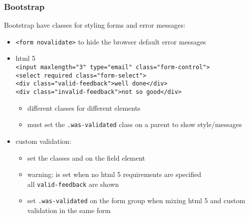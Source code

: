 \begin{frame}[fragile] \frametitle{Bootstrap}
Bootstrap have classes for styling forms and error messages:
\begin{itemize}
  \item \lstinline[style=htmlcssjs]{<form novalidate>} to hide the browser default error messages
  \item html 5
          \\ \lstinline[style=htmlcssjs]{<input maxlength="3" type="email" class="form-control">}
          \\ \lstinline[style=htmlcssjs]{<select required class="form-select">}
          \\ \lstinline[style=htmlcssjs]{<div class="valid-feedback">well done</div>}
          \\ \lstinline[style=htmlcssjs]{<div class="invalid-feedback">not so good</div>}
  \begin{itemize}
    \item different classes for different elements
    \item must set the \lstinline[style=htmlcssjs]{.was-validated} class on a parent to show style/messages
  \end{itemize}
  \item custom validation:
  \begin{itemize}
    \item set the classes  and  on the field element
    \item warning:  is set when no html 5 requirements are specified
          \\ all \lstinline[style=htmlcssjs]{valid-feedback} are shown
    \item set \lstinline[style=htmlcssjs]{.was-validated} on the form group when mixing html 5 and custom validation in the same form
  \end{itemize}
\end{itemize}
\end{frame}

